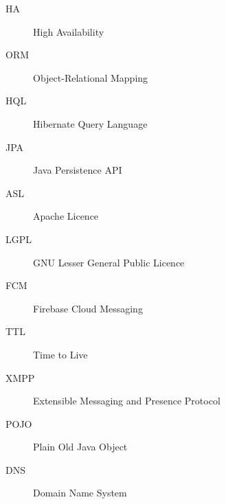\begin{description}
        \item[HA] High Availability
        \item[ORM] Object-Relational Mapping
        \item[HQL] Hibernate Query Language
        \item[JPA] Java Persistence API
        \item[ASL] Apache Licence
        \item[LGPL] GNU Lesser General Public Licence
        \item[FCM] Firebase Cloud Messaging
        \item[TTL] Time to Live
        \item[XMPP] Extensible Messaging and Presence Protocol
        \item[POJO] Plain Old Java Object
        \item[DNS] Domain Name System
\end{description}
	
